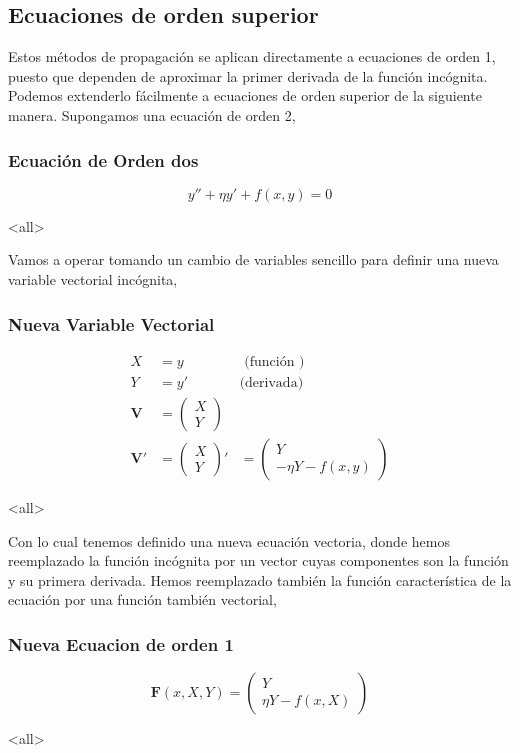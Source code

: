 \subsection{Ecuaciones de orden superior}

Estos métodos de propagación se aplican directamente a ecuaciones de orden 1,
puesto que dependen de aproximar la primer derivada de la función incógnita. 
Podemos extenderlo fácilmente a ecuaciones de orden superior de la siguiente manera.
Supongamos una ecuación de orden 2, 
\mode*
\begin{frame}[label=FrameEcuacionOrden2]
  \frametitle<presentation>{Ecuación de Orden dos}
  \begin{equation}
    y'' + \eta y' + f(x, y) = 0
  \end{equation}
\end{frame}
\mode<all>

Vamos a operar tomando un cambio de variables sencillo para definir una nueva variable vectorial 
incógnita, 
\mode*
\begin{frame}[label=FrameVariableVectorial]
  \frametitle<presentation>{Nueva Variable Vectorial}
  \begin{equation}
    \begin{aligned}
      X &= y &\text{ (función ) } \\
      Y &= y' &\text{(derivada) }\\
      \mathbf{V} &= \begin{pmatrix} X \\ Y  \end{pmatrix} \\
	\mathbf{V'} &=  \begin{pmatrix} X \\ Y  \end{pmatrix}' &= 
	  \begin{pmatrix}   Y \\ -\eta Y - f(x, y)  \end{pmatrix}
    \end{aligned}
  \end{equation}
\end{frame}
\mode<all>

Con lo cual tenemos definido una nueva ecuación vectoria, donde hemos reemplazado 
la función incógnita por un vector cuyas componentes son la función y su primera 
derivada. Hemos reemplazado también la función característica de la ecuación por una
función también vectorial, 

\mode*
\begin{frame}[label=FrameEcuacionOrdenSuparior]
  \frametitle<presentation>{Nueva Ecuacion de orden 1}
  \begin{equation}
    \mathbf{F}(x, X, Y) = \begin{pmatrix} Y\\ \eta Y - f(x, X)   \end{pmatrix}
  \end{equation}
\end{frame}
\mode<all>

